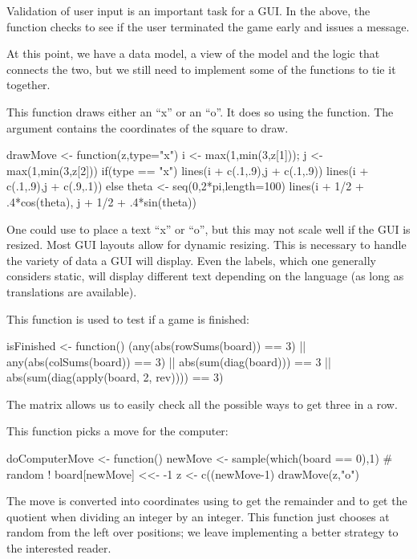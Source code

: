 Validation of user input is an important task for a GUI. In the above,
the  function checks to see if the user
terminated the game early and issues a message.

At this point, we have a data model, a view of the model and the
logic that connects the two, but we still need to implement some of the
functions to tie it together.


This function draws either an ``x'' or an ``o''. It does so using the
 function. The  argument contains the
coordinates of the square to draw.
\begin{Schunk}
\begin{Sinput}
 drawMove <- function(z,type="x") {
   i <- max(1,min(3,z[1])); j <- max(1,min(3,z[2]))
   if(type == "x") {
     lines(i + c(.1,.9),j + c(.1,.9))
     lines(i + c(.1,.9),j + c(.9,.1))
   } else {
     theta <- seq(0,2*pi,length=100)
     lines(i + 1/2 + .4*cos(theta), j + 1/2 + .4*sin(theta))
   }
 }
\end{Sinput}
\end{Schunk}

One could use  to place a text ``x'' or ``o'', but this may
not scale well if the GUI is resized. Most GUI layouts allow for
dynamic resizing. This is necessary to handle the variety of data a
GUI will display. Even the labels, which one generally considers
static, will display different text depending on the language (as long
as translations are available).

This function is used to test if a game is finished:
\begin{Schunk}
\begin{Sinput}
 isFinished <- function() {
   (any(abs(rowSums(board)) == 3) || 
    any(abs(colSums(board)) == 3) || 
    abs(sum(diag(board))) == 3 || 
    abs(sum(diag(apply(board, 2, rev)))) == 3)
 }
\end{Sinput}
\end{Schunk}
%
The matrix  allows us to easily check all the possible ways
to get three in a row.

This function picks a move for the computer:
\begin{Schunk}
\begin{Sinput}
 doComputerMove <- function() {
   newMove <- sample(which(board == 0),1) # random !
   board[newMove] <<- -1    
   z <- c((newMove-1) %
   drawMove(z,"o")
 }
\end{Sinput}
\end{Schunk}
%
The move is converted into coordinates using \code{\%\%} to get the
remainder and \code{\%/\%} to get the quotient when dividing an
integer by an integer. This function just chooses at random from the
left over positions; we leave implementing a better strategy to the
interested reader.

